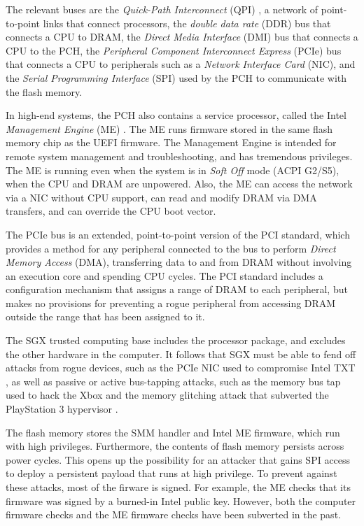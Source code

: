 The relevant buses are the \textit{Quick-Path Interconnect} (QPI)
\cite{intel2009qpi}, a network of point-to-point links that connect processors,
the \textit{double data rate} (DDR) bus that connects a CPU to DRAM, the
\textit {Direct Media Interface} (DMI) bus that connects a CPU to the PCH,
the \textit{Peripheral Component Interconnect Express} (PCIe) bus that connects
a CPU to peripherals such as a \textit{Network Interface Card} (NIC), and the
\textit {Serial Programming Interface} (SPI) used by the PCH to communicate
with the flash memory.

In high-end systems, the PCH also contains a service processor, called the
Intel \textit{Management Engine} (ME) \cite{ruan2014intelme}.  The ME runs
firmware stored in the same flash memory chip as the UEFI firmware. The
Management Engine is intended for remote system management and troubleshooting,
and has tremendous privileges. The ME is running even when the system is in
\textit{Soft Off} mode (ACPI G2/S5), when the CPU and DRAM are unpowered. Also,
the ME can access the network via a NIC without CPU support, can read and
modify DRAM via DMA transfers, and can override the CPU boot vector.

The PCIe bus is an extended, point-to-point version of the PCI standard, which
provides a method for any peripheral connected to the bus to perform
\textit{Direct Memory Access} (DMA), transferring data to and from DRAM without
involving an execution core and spending CPU cycles. The PCI standard includes
a configuration mechanism that assigns a range of DRAM to each peripheral, but
makes no provisions for preventing a rogue peripheral from accessing DRAM
outside the range that has been assigned to it.

The SGX trusted computing base includes the processor package, and excludes the
other hardware in the computer. It follows that SGX must be able to fend off
attacks from rogue devices, such as the PCIe NIC used to compromise Intel TXT
\cite{wojtczuk2011txt}, as well as passive or active bus-tapping attacks, such
as the memory bus tap used to hack the Xbox \cite{huang2003xbox} and the
memory glitching attack that subverted the PlayStation 3 hypervisor
\cite{hotz2010ps3}.

The flash memory stores the SMM handler and Intel ME firmware, which run with
high privileges. Furthermore, the contents of flash memory persists across
power cycles. This opens up the possibility for an attacker that gains SPI
access to deploy a persistent payload that runs at high privilege. To prevent
against these attacks, most of the firware is signed. For example, the ME
checks that its firmware was signed by a burned-in Intel public key. However,
both the computer firmware checks \cite{wojtczuk2010bios} and the ME firmware
checks \cite{tereshkin2009amt} have been subverted in the past.

